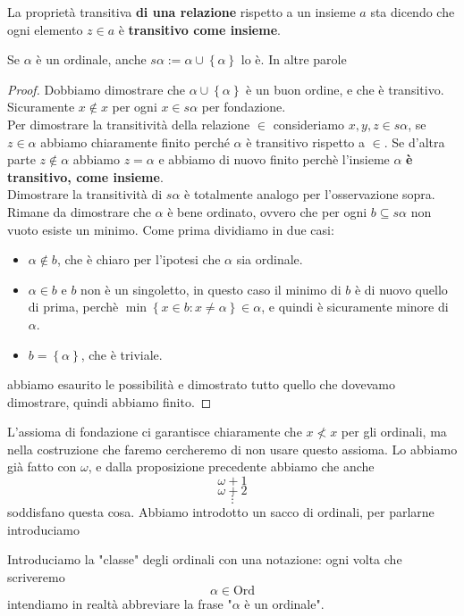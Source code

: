 \documentclass[11pt]{scrartcl}
\begin{document}
 	\begin{remark}
 		La proprietà transitiva \textbf{di una relazione} rispetto a un insieme $a$ sta dicendo che ogni elemento $z\in a$ è \textbf{transitivo come insieme}.
 	\end{remark}
 	\begin{proposition}
 		Se $\alpha$ è un ordinale, anche $s\alpha:=\alpha\cup \left\{\alpha\right\}$ lo è. In altre parole 
 	\end{proposition}
 	\begin{proof}
 		Dobbiamo dimostrare che $\alpha\cup \left\{\alpha\right\}$ è un buon ordine, e che è transitivo. Sicuramente $x\not\in x$ per ogni $x\in s\alpha$ per fondazione. \\
 		Per dimostrare la transitività della relazione $\in$ consideriamo $x,y,z\in s\alpha$, se $z\in \alpha$ abbiamo chiaramente finito perché $\alpha$ è transitivo rispetto a $\in$. Se d'altra parte $z\not \in \alpha$ abbiamo $z=\alpha$ e abbiamo di nuovo finito perchè l'insieme $\alpha$ \textbf{è transitivo, come insieme}. \\
 		Dimostrare la transitività di $s\alpha$ è totalmente analogo per l'osservazione sopra. \\
 		Rimane da dimostrare che $\alpha$ è bene ordinato, ovvero che per ogni $b\subseteq s\alpha$ non vuoto esiste un minimo. Come prima dividiamo in due casi:
 		\begin{itemize}
 			\item $\alpha\not\in b$, che è chiaro per l'ipotesi che $\alpha$ sia ordinale.
 			\item $\alpha\in b$ e $b$ non è un singoletto, in questo caso il minimo di $b$ è di nuovo quello di prima, perchè $\min\left\{x\in b:x\ne \alpha \right\}\in \alpha$, e quindi è sicuramente minore di $\alpha$.
 			\item $b=\left\{\alpha\right\}$, che è triviale. 
 		\end{itemize}
 		abbiamo esaurito le possibilità e dimostrato tutto quello che dovevamo dimostrare, quindi abbiamo finito.
 	\end{proof}
 	L'assioma di fondazione ci garantisce chiaramente che $x\not< x$ per gli ordinali, ma nella costruzione che faremo cercheremo di non usare questo assioma. Lo abbiamo già fatto con $\omega$, e dalla proposizione precedente abbiamo che anche 
 	$$\omega+1$$
 	$$\omega+2$$
 	$$\vdots$$
 	soddisfano questa cosa. Abbiamo introdotto un sacco di ordinali, per parlarne introduciamo
 	\begin{definition}
 		Introduciamo la "classe" degli ordinali con una notazione: ogni volta che scriveremo
 		$$\alpha\in \text{Ord}$$
 		intendiamo in realtà abbreviare la frase "$\alpha$ è un ordinale".
 	\end{definition}
\end{document}
